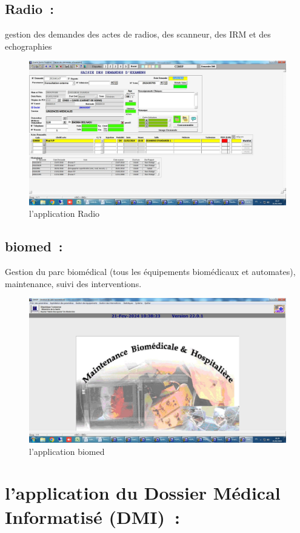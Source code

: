 \documentclass[12pt]{rapportINPTCLOUD}
\begin{document}
\subsection{Radio :}   gestion des demandes des actes de radios, des scanneur, des IRM et des echographies
\begin{figure}[H]
	\centering
	\includegraphics[width=1\linewidth]{img/j.jpg}
	\caption{l'application Radio}
	\label{fig:Radio}
\end{figure}

\subsection{biomed :}  Gestion du parc biomédical (tous les équipements biomédicaux et automates), maintenance, suivi des interventions.
\begin{figure}[H]
	\centering
	\includegraphics[width=1\linewidth]{img/k.jpg}
	\caption{l'application biomed}
	\label{fig:biomed}
\end{figure}
\newpage
	\section{\textcolor{sectioncolor}{l'application du Dossier Médical Informatisé (DMI) :}}
	
\end{document}
